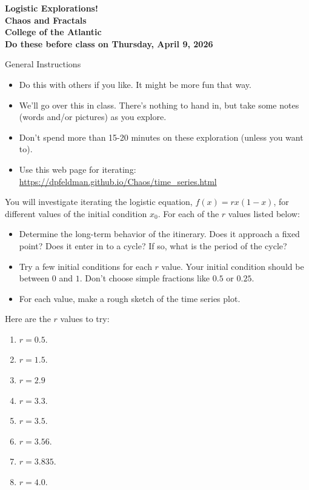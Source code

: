 \documentclass[12pt]{article}
\begin{document}
\pagestyle{empty}
 
\begin{center}
{\LARGE {\bf Logistic Explorations!}}\\
\bigskip
{\Large {\bf Chaos and Fractals}}\\
\bigskip
{\Large {\bf College of the Atlantic}}\\
\bigskip
    {{\bf Do these before class on Thursday, April 9, 2026}}\\ 
\end{center}
\medskip

\noindent General Instructions

\begin{itemize}
\setlength{\itemsep}{0mm}
\item Do this with others if you like. It might be more fun that
  way.
\item We'll go over this in class. There's nothing to hand in, but
  take some notes (words and/or pictures) as you explore.
\item Don't spend more than 15-20 minutes on these exploration (unless
  you want to).
  \item Use this web page for iterating:
\href{https://dpfeldman.github.io/Chaos/time_series.html}{https://dpfeldman.github.io/Chaos/time\_series.html}
\end{itemize}


\noindent You will investigate iterating the logistic equation, $f(x)
= rx(1-x)$, for different values of the initial condition $x_0$.  For
each of the $r$ values listed below:
\begin{itemize}
  \setlength{\itemsep}{0mm}
  \item Determine the long-term behavior of the itinerary. Does it
    approach a fixed point?  Does it enter in to a cycle?  If so, what
    is the period of the cycle?
  \item Try a few initial conditions for each $r$ value.  Your initial
    condition should be between $0$ and $1$.  Don't choose simple
    fractions like $0.5$ or $0.25$.
  \item For each value, make a rough sketch of the time series plot.\\
\end{itemize}


\noindent Here are the $r$ values to try:
\begin{enumerate}
\item $r=0.5$.
\item $r=1.5$.
\item $r=2.9$ 
\item $r=3.3$.
\item $r=3.5$.
\item $r=3.56$.
\item $r=3.835$.
\item $r=4.0$.
\end{enumerate}
\end{document}
